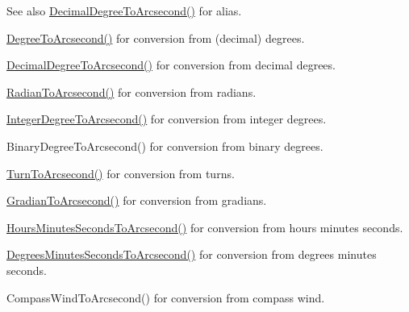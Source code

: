 \begin{DoxySeeAlso}{See also}
\mbox{\hyperlink{group___e_g_x_math-_conversions-_angle_conversions-_decimal_degree_gab9d5635a6e35127b5245978aba508962}{Decimal\+Degree\+To\+Arcsecond()}} for alias. 

\mbox{\hyperlink{group___e_g_x_math-_conversions-_angle_conversions-_degree_gaf85e2d765c248f447854a807a68a5de8}{Degree\+To\+Arcsecond()}} for conversion from (decimal) degrees. 

\mbox{\hyperlink{group___e_g_x_math-_conversions-_angle_conversions-_decimal_degree_gab9d5635a6e35127b5245978aba508962}{Decimal\+Degree\+To\+Arcsecond()}} for conversion from decimal degrees. 

\mbox{\hyperlink{group___e_g_x_math-_conversions-_angle_conversions-_radian_ga2f952f6675a0fc54bf72bfe4e3d2664a}{Radian\+To\+Arcsecond()}} for conversion from radians. 

\mbox{\hyperlink{group___e_g_x_math-_conversions-_angle_conversions-_integer_degree_gaa04058a2fea3dc3678264a05fac6e1ae}{Integer\+Degree\+To\+Arcsecond()}} for conversion from integer degrees. 

Binary\+Degree\+To\+Arcsecond() for conversion from binary degrees. 

\mbox{\hyperlink{group___e_g_x_math-_conversions-_angle_conversions-_turn_gaad072969abc59ef6f5b63ac6a176a11b}{Turn\+To\+Arcsecond()}} for conversion from turns. 

\mbox{\hyperlink{group___e_g_x_math-_conversions-_angle_conversions-_gradian_gac768fd444195264165d332f2f5e84d92}{Gradian\+To\+Arcsecond()}} for conversion from gradians. 

\mbox{\hyperlink{group___e_g_x_math-_conversions-_angle_conversions-_hours_minutes_seconds_ga14620899c81c1f5e65cde96ef4ee626e}{Hours\+Minutes\+Seconds\+To\+Arcsecond()}} for conversion from hours minutes seconds. 

\mbox{\hyperlink{group___e_g_x_math-_conversions-_angle_conversions-_degrees_minutes_seconds_gabebc8a012be0442c12409a2a71661ed4}{Degrees\+Minutes\+Seconds\+To\+Arcsecond()}} for conversion from degrees minutes seconds. 

Compass\+Wind\+To\+Arcsecond() for conversion from compass wind. 
\end{DoxySeeAlso}
\mbox{\label{group___e_g_x_math-_conversions-_angle_conversions-_degree_gacd1e3dc5194e89426a899a7cac4874f8}} 
